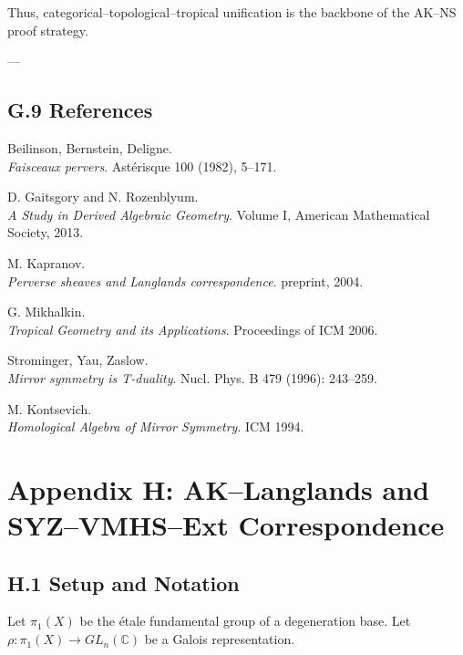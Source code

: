 \documentclass[11pt]{article}
\begin{document}
Thus, categorical–topological–tropical unification is the backbone of the AK–NS proof strategy.

---

\subsection*{G.9 References}

\begin{thebibliography}{9}

Beilinson, Bernstein, Deligne.\\
\textit{Faisceaux pervers}. Astérisque 100 (1982), 5–171.

D. Gaitsgory and N. Rozenblyum.\\
\textit{A Study in Derived Algebraic Geometry}.  
Volume I, American Mathematical Society, 2013.

M. Kapranov.\\
\textit{Perverse sheaves and Langlands correspondence}.  
preprint, 2004.

G. Mikhalkin.\\
\textit{Tropical Geometry and its Applications}.  
Proceedings of ICM 2006.

Strominger, Yau, Zaslow.\\
\textit{Mirror symmetry is T-duality}.  
Nucl. Phys. B 479 (1996): 243–259.

M. Kontsevich.\\
\textit{Homological Algebra of Mirror Symmetry}.  
ICM 1994.

\end{thebibliography}



\section*{Appendix H: AK–Langlands and SYZ–VMHS–Ext Correspondence}

\subsection*{H.1 Setup and Notation}
Let $\pi_1(X)$ be the étale fundamental group of a degeneration base. Let $\rho: \pi_1(X) \to GL_n(\mathbb{C})$ be a Galois representation.
\end{document}
